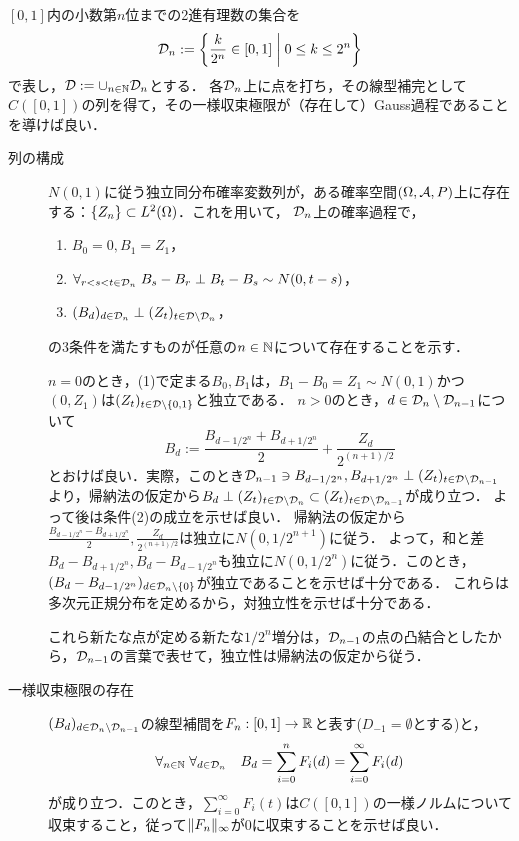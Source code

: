 \documentclass[uplatex,dvipdfmx]{jsreport}
\begin{document}
\begin{construction}
    $[0,1]$内の小数第$n$位までの2進有理数の集合を
    \[\mathcal{D}_n:=\left\{\frac{k}{2^n}\in[0,1]\;\middle|\;0\le k\le 2^n\right\}\]
    で表し，$\mathcal{D}:=\cup_{n\in\mathbb{N}}\mathcal{D}_n$とする．
    各$\mathcal{D}_n$上に点を打ち，その線型補完として$C([0,1])$の列を得て，その一様収束極限が（存在して）Gauss過程であることを導けば良い．
    \begin{description}
        \item[列の構成] $N(0,1)$に従う独立同分布確率変数列が，ある確率空間$(\Omega,\mathcal{A},P)$上に存在する：$\{Z_n\}\subset L^2(\Omega)$．これを用いて，
        $\mathcal{D}_n$上の確率過程で，
        \begin{enumerate}
            \item $B_0=0,B_1=Z_1$，
            \item $\forall_{r<s<t\in\mathcal{D}_n}\;B_s-B_r\perp B_t-B_s\sim N(0,t-s)$，
            \item $(B_d)_{d\in\mathcal{D}_n}\perp(Z_t)_{t\in\mathcal{D}\setminus\mathcal{D}_n}$，
        \end{enumerate}
        の3条件を満たすものが任意の$n\in\mathbb{N}$について存在することを示す．

        $n=0$のとき，(1)で定まる$B_0,B_1$は，$B_1-B_0=Z_1\sim N(0,1)$かつ$(0,Z_1)$は$(Z_t)_{t\in\mathcal{D}\setminus\{0,1\}}$と独立である．
        $n>0$のとき，$d\in\mathcal{D}_n\setminus\mathcal{D}_{n-1}$について
        \[B_d:=\frac{B_{d-1/2^n}+B_{d+1/2^n}}{2}+\frac{Z_d}{2^{(n+1)/2}}\]
        とおけば良い．実際，このとき$\mathcal{D}_{n-1}\ni B_{d-1/2^n},B_{d+1/2^n}\perp (Z_t)_{t\in\mathcal{D}\setminus\mathcal{D}_{n-1}}$より，帰納法の仮定から$B_d\perp(Z_t)_{t\in\mathcal{D}\setminus\mathcal{D}_n}\subset(Z_t)_{t\in\mathcal{D}\setminus\mathcal{D}_{n-1}}$が成り立つ．
        よって後は条件(2)の成立を示せば良い．
        帰納法の仮定から$\frac{B_{d-1/2^n}-B_{d+1/2^n}}{2},\frac{Z_d}{2^{(n+1)/2}}$は独立に$N(0,1/2^{n+1})$に従う．
        よって，和と差$B_d-B_{d+1/2^n},B_d-B_{d-1/2^n}$も独立に$N(0,1/2^n)$に従う．このとき，$(B_d-B_{d-1/2^n})_{d\in\mathcal{D}_n\setminus\{0\}}$が独立であることを示せば十分である．
        これらは多次元正規分布を定めるから，対独立性を示せば十分である．
        
        これら新たな点が定める新たな$1/2^n$増分は，$\mathcal{D}_{n-1}$の点の凸結合としたから，$\mathcal{D}_{n-1}$の言葉で表せて，独立性は帰納法の仮定から従う．
        \item[一様収束極限の存在]
        $(B_d)_{d\in\mathcal{D}_n\setminus\mathcal{D}_{n-1}}$の線型補間を$F_n:[0,1]\to\mathbb{R}$と表す($D_{-1}=\emptyset$とする)と，
        \[\forall_{n\in\mathbb{N}}\;\forall_{d\in\mathcal{D}_n}\quad B_d=\sum^n_{i=0}F_i(d)=\sum^\infty_{i=0}F_i(d)\]
        が成り立つ．このとき，$\sum^\infty_{i=0}F_i(t)$は$C([0,1])$の一様ノルムについて収束すること，従って$\|F_n\|_\infty$が$0$に収束することを示せば良い．


\end{description}
\end{construction}
\end{document}
